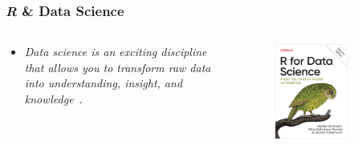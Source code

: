 \documentclass[aspectratio=169]{beamer}
\begin{document}
\begin{frame}
    \frametitle{\textit{R} \& Data Science}
    \begin{columns}
        \begin{column}{0.5\textwidth}
            \begin{itemize}
                \item \emph{Data science is an exciting discipline that allows 
                    you to transform raw data into understanding, insight, and 
                    knowledge}~\cite{wickham2023}.
            \end{itemize}
        \end{column}
        \begin{column}{0.5\textwidth}
            \begin{figure}
                \centering
                \includegraphics[width=0.7\textwidth]
                {img/wickham2023.jpg}
            \end{figure}
        \end{column}
    \end{columns}
\end{frame}
\end{document}
